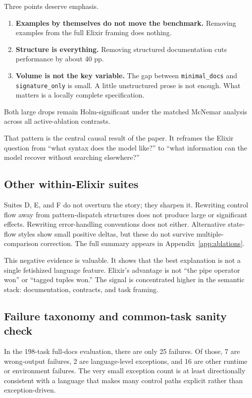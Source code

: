 \documentclass[11pt]{article}
\newcommand{\pp}{pp}
\newcommand{\elixir}{Elixir}
\begin{document}
Three points deserve emphasis.

\begin{enumerate}
  \item \textbf{Examples by themselves do not move the benchmark.} Removing examples from the full \elixir{} framing does nothing.
  \item \textbf{Structure is everything.} Removing structured documentation cuts performance by about 40 \pp{}.
  \item \textbf{Volume is not the key variable.} The gap between \texttt{minimal\_docs} and \texttt{signature\_only} is small. A little unstructured prose is not enough. What matters is a locally complete specification.
\end{enumerate}

Both large drops remain Holm-significant under the matched McNemar analysis across all active-ablation contrasts.

That pattern is the central causal result of the paper. It reframes the \elixir{} question from ``what syntax does the model like?'' to ``what information can the model recover without searching elsewhere?''

\subsection{Other within-\elixir{} suites}

Suites D, E, and F do not overturn the story; they sharpen it. Rewriting control flow away from pattern-dispatch structures does not produce large or significant effects. Rewriting error-handling conventions does not either. Alternative state-flow styles show small positive deltas, but these do not survive multiple-comparison correction. The full summary appears in Appendix~\ref{app:ablations}.

This negative evidence is valuable. It shows that the best explanation is not a single fetishized language feature. \elixir{}'s advantage is not ``the pipe operator won'' or ``tagged tuples won.'' The signal is concentrated higher in the semantic stack: documentation, contracts, and task framing.

\subsection{Failure taxonomy and common-task sanity check}

In the 198-task full-docs evaluation, there are only 25 failures. Of those, 7 are wrong-output failures, 2 are language-level exceptions, and 16 are other runtime or environment failures. The very small exception count is at least directionally consistent with a language that makes many control paths explicit rather than exception-driven.
\end{document}
